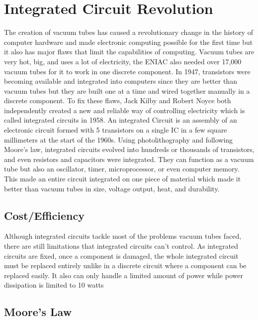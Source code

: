 \documentclass[letterpaper, 10 pt, conference]{IEEEconf}
\begin{document}

\section{Integrated Circuit Revolution}

The creation of vacuum tubes has caused a revolutionary change in the history of computer hardware and made electronic computing possible for the first time but it also has major flaws that limit the capabilities of computing. Vacuum tubes are very hot, big, and uses a lot of electricity, the ENIAC also needed over 17,000 vacuum tubes for it to work in one discrete component. In 1947, transistors were becoming available and integrated into computers since they are better than vacuum tubes but they are built one at a time and wired together manually in a discrete component. To fix these flaws, Jack Kilby and Robert Noyce both independently created a new and reliable way of controlling electricity which is called integrated circuits in 1958. An integrated Circuit is an assembly of an electronic circuit formed with 5 transistors on a single IC in a few square millimeters at the start of the 1960s. Using photolithography and following Moore’s law, integrated circuits evolved into hundreds or thousands of transistors, and even resistors and capacitors were integrated. They can function as a vacuum tube but also an oscillator, timer, microprocessor, or even computer memory. This made an entire circuit integrated on one piece of material which made it better than vacuum tubes in size, voltage output, heat, and durability.

\subsection{Cost/Efficiency}

Although integrated circuits tackle most of the problems vacuum tubes faced, there are still limitations that integrated circuits can’t control. As integrated circuits are fixed, once a component is damaged, the whole integrated circuit must be replaced entirely unlike in a discrete circuit where a component can be replaced easily. It also can only handle a limited amount of power while power dissipation is limited to 10 watts 

\subsection{Moore's Law}
\end{document}
